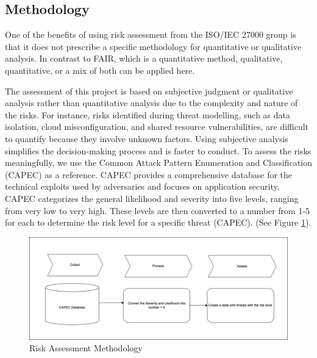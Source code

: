 \subsection{Methodology}
One of the benefits of using risk assessment from the ISO/IEC 27000 group is that it does not prescribe a specific methodology for quantitative or qualitative analysis. In contrast to FAIR, which is a quantitative method, qualitative, quantitative, or a mix of both can be applied here. 

The assessment of this project is based on subjective judgment or qualitative analysis rather than quantitative analysis due to the complexity and nature of the risks. For instance, risks identified during threat modelling, such as data isolation, cloud misconfiguration, and shared resource vulnerabilities, are difficult to quantify because they involve unknown factors. Using subjective analysis simplifies the decision-making process and is faster to conduct. To assess the risks meaningfully, we use the Common Attack Pattern Enumeration and Classification (CAPEC) as a reference. CAPEC provides a comprehensive database for the technical exploits used by adversaries and focuses on application security. CAPEC categorizes the general likelihood and severity into five levels, ranging from very low to very high. These levels are then converted to a number from 1-5 for each to determine the risk level for a specific threat (CAPEC). (See Figure \ref{fig:ris_assessment_method}). 

\begin{figure}[h!]
\centering
\includegraphics[width=\textwidth]{pics/risk_assessment_method.png}
\caption{Risk Assessment Methodology}\label{fig:ris_assessment_method}
\end{figure}

